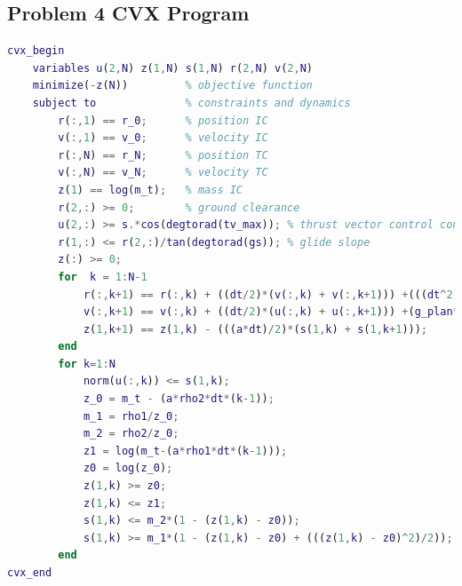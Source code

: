 \documentclass[journal]{new-aiaa}
\begin{document}
\begin{singlespace}
\subsection{Problem 4 CVX Program}
\scriptsize
\begin{lstlisting}[language=MATLAB]
cvx_begin
	variables u(2,N) z(1,N) s(1,N) r(2,N) v(2,N)
	minimize(-z(N))			% objective function
	subject to 				% constraints and dynamics
		r(:,1) == r_0;		% position IC
		v(:,1) == v_0;		% velocity IC
		r(:,N) == r_N; 		% position TC
		v(:,N) == v_N;		% velocity TC
		z(1) == log(m_t);	% mass IC
		r(2,:) >= 0;		% ground clearance
		u(2,:) >= s.*cos(degtorad(tv_max));	% thrust vector control constraint
		r(1,:) <= r(2,:)/tan(degtorad(gs));	% glide slope
        z(:) >= 0;
		for  k = 1:N-1
			r(:,k+1) == r(:,k) + ((dt/2)*(v(:,k) + v(:,k+1))) +(((dt^2)/12)*(u(:,k+1) - u(:,k)));
			v(:,k+1) == v(:,k) + ((dt/2)*(u(:,k) + u(:,k+1))) +(g_plan*dt);
			z(1,k+1) == z(1,k) - (((a*dt)/2)*(s(1,k) + s(1,k+1)));
        end
		for k=1:N
			norm(u(:,k)) <= s(1,k);
			z_0 = m_t - (a*rho2*dt*(k-1));
			m_1 = rho1/z_0;
			m_2 = rho2/z_0;
			z1 = log(m_t-(a*rho1*dt*(k-1)));	
			z0 = log(z_0);
			z(1,k) >= z0;
			z(1,k) <= z1;
			s(1,k) <= m_2*(1 - (z(1,k) - z0));
			s(1,k) >= m_1*(1 - (z(1,k) - z0) + (((z(1,k) - z0)^2)/2));
        end
cvx_end
\end{lstlisting}
\normalsize


\end{singlespace}
\end{document}
